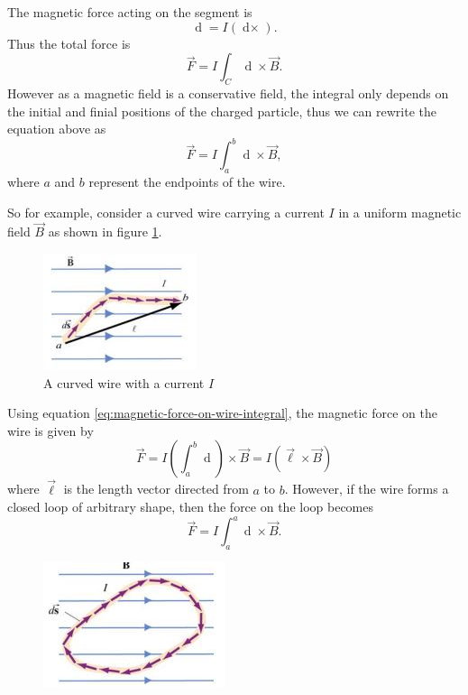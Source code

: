 The magnetic force acting on the segment is 
\begin{equation}
    \mathop{\mathrm{d}\vec{F}} = I(\mathop{\mathrm{d}\vec{s} \times \vec{B}}).
\end{equation}
Thus the total force is
\begin{equation}
    \vec{F} = I \int_C \mathop{\mathrm{d}\vec{s}} \times \vec{B}.
\end{equation}
However as a magnetic field is a conservative field, the integral only depends on the initial and finial positions of the charged particle, thus we can rewrite the equation above as
\begin{equation}
    \label{eq:magnetic-force-on-wire-integral}
    \vec{F} = I \int_a^b \mathop{\mathrm{d}\vec{s}} \times \vec{B},
\end{equation}
where $a$ and $b$ represent the endpoints of the wire.

So for example, consider a curved wire carrying a current $I$ in a uniform magnetic field $\vec{B}$ as shown in figure \ref{fig:magnetic-field-wire-4}.

\begin{figure}[h!]
    \centering
    \includegraphics{notes/images/Magnetic-Field-Wire-4.JPG}
    \caption{A curved wire with a current $I$}
    \label{fig:magnetic-field-wire-4}
\end{figure}
\FloatBarrier

Using equation \ref{eq:magnetic-force-on-wire-integral}, the magnetic force on the wire is given by
\begin{equation}
    \vec{F} = I \left(\int_a^b \mathop{\mathrm{d}\vec{s}}\right) \times \vec{B} = I(\vec{\ell} \times \vec{B})
\end{equation}
where $\vec{\ell}$ is the length vector directed from $a$ to $b$. However, if the wire forms a closed loop of arbitrary shape, then the force on the loop becomes
\begin{equation}
    \vec{F} = I \int_a^a \mathop{\mathrm{d}\vec{s}} \times \vec{B}.
\end{equation}

\begin{figure}[h!]
    \centering
    \includegraphics{notes/images/Magnetic-Field-Wire-5.JPG}
\end{figure}
\FloatBarrier

